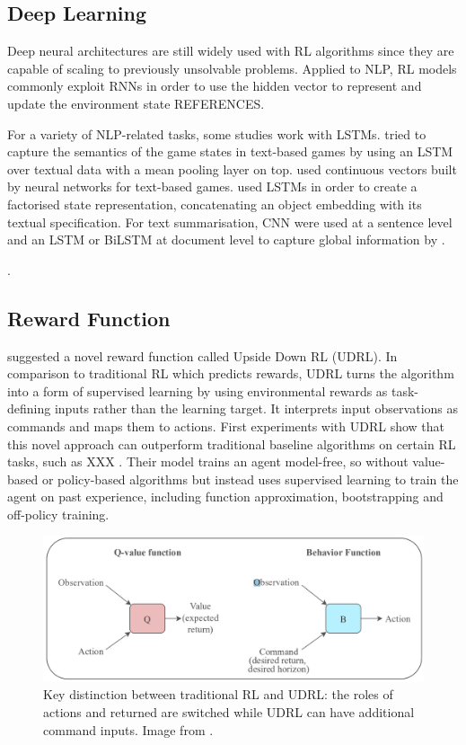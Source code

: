 \documentclass[11pt,a4paper]{article}
\begin{document}
\subsection{Deep Learning}
Deep neural architectures are still widely used with RL algorithms since they are capable of scaling to previously unsolvable problems. Applied to NLP, RL models commonly exploit RNNs in order to use the hidden vector to represent and update the environment state REFERENCES. 

For a variety of NLP-related tasks, some studies work with LSTMs. \citet{narasimhan-etal-2016-improving} tried to capture the semantics of the game states in text-based games by using an LSTM over textual data with a mean pooling layer on top. \citet{he-etal-2016-deep-reinforcement} used continuous vectors built by neural networks for text-based games. \citet{narasimhan-2018} used LSTMs in order to create a factorised state representation, concatenating an object embedding with its textual specification. For text summarisation, CNN were used at a sentence level and an LSTM or BiLSTM at document level to capture global information by \citet{chen-bansal-2018-fast}. 

\citet{yasui-etal-2019, zhang-2018, li-etal-2016-deep, ranzato2015sequence}. 

\subsection{Reward Function}
\citet{schmidhuber2019reinforcement} suggested a novel reward function called Upside Down RL (UDRL). In comparison to traditional RL which predicts rewards, UDRL turns the algorithm into a form of supervised learning by using environmental rewards as task-defining inputs rather than the learning target. It interprets input observations as commands and maps them to actions. First experiments with UDRL show that this novel approach can outperform traditional baseline algorithms on certain RL tasks, such as XXX \citet{srivastava2019training}. Their model trains an agent model-free, so without value-based or policy-based algorithms but instead uses supervised learning to train the agent on past experience, including function approximation, bootstrapping and off-policy training.

\begin{figure}[h!]
\centering
\includegraphics[scale=.42]{img/udrl_graphic.PNG}
\caption{Key distinction between traditional RL and UDRL: the roles of actions and returned are switched while UDRL can have additional command inputs. Image from \citep{srivastava2019training}.}
\end{figure}
\end{document}
